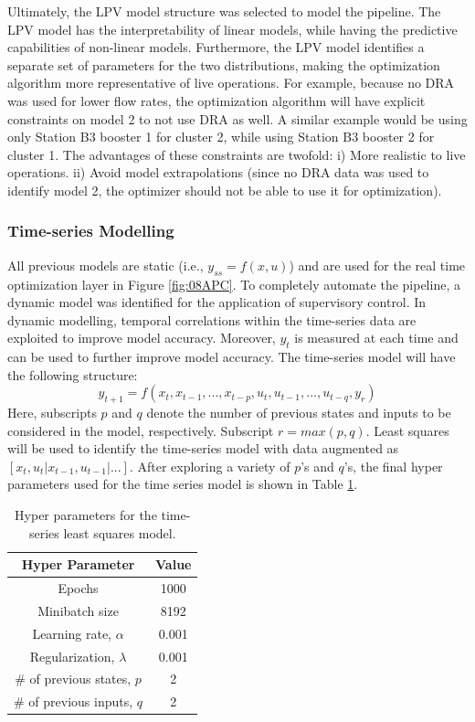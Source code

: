 Ultimately, the LPV model structure was selected to model the pipeline.  The LPV model has the interpretability of linear models, while having the predictive capabilities of non-linear models.  Furthermore, the LPV model identifies a separate set of parameters for the two distributions, making the optimization algorithm more representative of live operations.  For example, because no DRA was used for lower flow rates, the optimization algorithm will have explicit constraints on model 2 to not use DRA as well. A similar example would be using only Station B3 booster 1 for cluster 2, while using Station B3 booster 2 for cluster 1.  The advantages of these constraints are twofold: i) More realistic to live operations.  ii) Avoid model extrapolations (since no DRA data was used to identify model 2, the optimizer should not be able to use it for optimization).

\subsubsection{Time-series Modelling}
All previous models are static (i.e., $y_{ss} = f(x, u)$) and are used for the real time optimization layer in Figure \ref{fig:08APC}. To completely automate the pipeline, a dynamic model was identified for the application of supervisory control. In dynamic modelling, temporal correlations within the time-series data are exploited to improve model accuracy.  Moreover, $y_t$ is measured at each time and can be used to further improve model accuracy. The time-series model will have the following structure:
\begin{equation}
    y_{t+1} = f(x_{t}, x_{t - 1}, ..., x_{t-p}, u_{t}, u_{t - 1}, ..., u_{t - q}, y_{r})
\end{equation}
Here, subscripts $p$ and $q$ denote the number of previous states and inputs to be considered in the model, respectively.  Subscript $r = max(p, q)$. Least squares will be used to identify the time-series model with data augmented as $[x_t, u_t | x_{t - 1}, u_{t - 1} | ... ]$.  After exploring a variety of $p$'s and $q$'s, the final hyper parameters used for the time series model is shown in Table \ref{tab:08ts_parameters}.
\begin{table}[h]
    \centering
    {
    \begin{tabular}{ c | c}
        Hyper Parameter                  &  Value       \\
        \hline
        Epochs                           &  1000      \\
        Minibatch size                   &  8192     \\
        Learning rate, $\alpha$          &  0.001    \\
        Regularization, $\lambda$        &  0.001    \\
        $\#$ of previous states, $p$     &  2  \\
        $\#$ of previous inputs, $q$     &  2  \\
    \end{tabular}}
    \caption{Hyper parameters for the time-series least squares model.}
    \label{tab:08ts_parameters}
\end{table}

